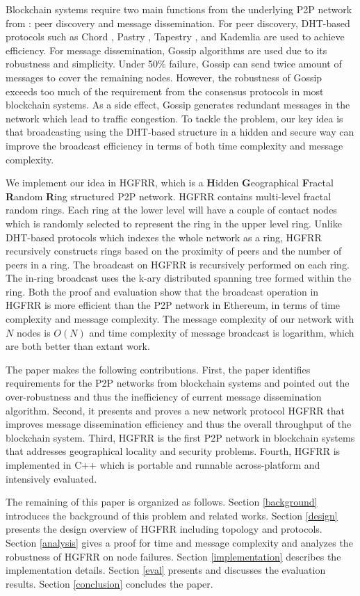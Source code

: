 Blockchain systems require two main functions from the underlying P2P network from : peer discovery and message dissemination. For peer discovery, DHT-based protocols such as Chord \cite{stoica2001chord}, Pastry \cite{rowstron2001pastry}, Tapestry \cite{zhao2004tapestry}, and Kademlia \cite{maymounkov2002kademlia} are used to achieve efficiency. For message dissemination, Gossip algorithms are used due to its robustness and simplicity. Under 50\% failure, Gossip can send twice amount of messages to cover the remaining nodes. However, the robustness of Gossip exceeds too much of the requirement from the consensus protocols in most blockchain systems. As a side effect, Gossip generates redundant messages in the network which lead to traffic congestion. To tackle the problem, our key idea is that broadcasting using the DHT-based structure in a hidden and secure way can improve the broadcast efficiency in terms of both time complexity and message complexity.

We implement our idea in HGFRR, which is a \textbf{H}idden \textbf{G}eographical \textbf{F}ractal \textbf{R}andom \textbf{R}ing structured P2P network. HGFRR contains multi-level fractal random rings. Each ring at the lower level will have a couple of contact nodes which is randomly selected to represent the ring in the upper level ring. Unlike DHT-based protocols which indexes the whole network as a ring, HGFRR recursively constructs rings based on the proximity of peers and the number of peers in a ring. The broadcast on HGFRR is recursively performed on each ring. The in-ring broadcast uses the k-ary distributed spanning tree formed within the ring. Both the proof and evaluation show that the broadcast operation in HGFRR is more efficient than the P2P network in Ethereum, in terms of time complexity and message complexity. The message complexity of our network with $N$ nodes is $O(N)$ and time complexity of message broadcast is logarithm, which are both better than extant work.

The paper makes the following contributions. First, the paper identifies requirements for the P2P networks from blockchain systems and pointed out the over-robustness and thus the inefficiency of current message dissemination algorithm. Second, it presents and proves a new network protocol HGFRR that improves message dissemination efficiency and thus the overall throughput of the blockchain system. Third, HGFRR is the first P2P network in blockchain systems that addresses geographical locality and security problems. Fourth, HGFRR is implemented in C++ which is portable and runnable across-platform and intensively evaluated.

The remaining of this paper is organized as follows. Section \cref{background} introduces the background of this problem and related works. Section \cref{design} presents the design overview of HGFRR including topology and protocols. Section \cref{analysis} gives a proof for time and message complexity and analyzes the robustness of HGFRR on node failures. Section \cref{implementation} describes the implementation details. Section \cref{eval} presents and discusses the evaluation results. Section \cref{conclusion} concludes the paper.